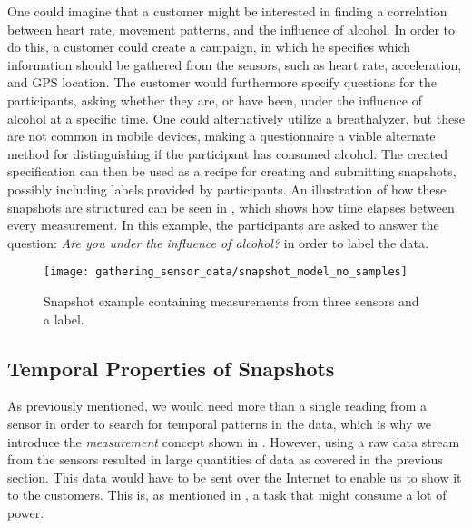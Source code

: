 One could imagine that a customer might be interested in finding a correlation between heart rate, movement patterns, and the influence of alcohol. In order to do this, a customer could create a campaign, in which he specifies which information should be gathered from the sensors, such as heart rate, acceleration, and GPS location. The customer would furthermore specify questions for the participants, asking whether they are, or have been, under the influence of alcohol at a specific time. One could alternatively utilize a breathalyzer, but these are not common in mobile devices, making a questionnaire a viable alternate method for distinguishing if the participant has consumed alcohol. The created specification can then be used as a recipe for creating and submitting snapshots, possibly including labels provided by participants. An illustration of how these snapshots are structured can be seen in , which shows how time elapses between every measurement. In this example, the participants are asked to answer the question: \emph{Are you under the influence of alcohol?} in order to label the data.
\\
\begin{figure}[!htbp]
    \centering
    \texttt{[image: gathering\_sensor\_data/snapshot\_model\_no\_samples]}
    \caption{Snapshot example containing measurements from three sensors and a label.}
    \label{fig:snapshot_model_no_samples}
\end{figure}
\FloatBarrier



\subsection{Temporal Properties of Snapshots}
\label{sec:temporal_properties_of_snapshots}


As previously mentioned, we would need more than a single reading from a sensor in order to search for temporal patterns in the data, which is why we introduce the \emph{measurement} concept shown in . However, using a raw data stream from the sensors resulted in large quantities of data as covered in the previous section. This data would have to be sent over the Internet to enable us to show it to the customers. This is, as mentioned in , a task that might consume a lot of power. 

